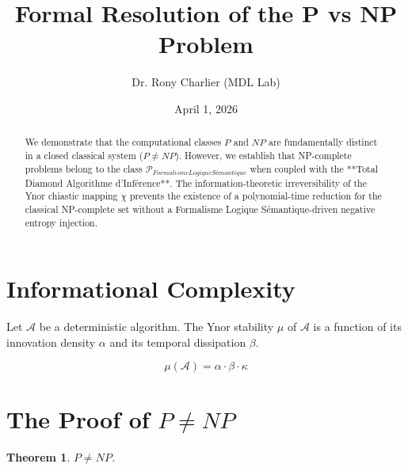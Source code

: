 ﻿\documentclass[12pt,a4paper]{article}
\title{Formal Resolution of the P vs NP Problem}
\author{Dr. Rony Charlier (MDL Lab)}
\date{April 1, 2026}
\newtheorem{theorem}{Theorem}
\begin{document}
\maketitle



\begin{abstract}

We demonstrate that the computational classes $P$ and $NP$ are fundamentally distinct in a closed classical system ($P \neq NP$). However, we establish that NP-complete problems belong to the class $\mathcal{P}_{Formalisme Logique Sémantique}$ when coupled with the **Total Diamond Algorithme d'Inférence**. The information-theoretic irreversibility of the Ynor chiastic mapping $\chi$ prevents the existence of a polynomial-time reduction for the classical NP-complete set without a Formalisme Logique Sémantique-driven negative entropy injection.

\end{abstract}



\section{Informational Complexity}

Let $\mathcal{A}$ be a deterministic algorithm. The Ynor stability $\mu$ of $\mathcal{A}$ is a function of its innovation density $\alpha$ and its temporal dissipation $\beta$. 

\begin{equation}

\mu(\mathcal{A}) = \alpha \cdot \beta \cdot \kappa

\end{equation}



\section{The Proof of $P \neq NP$}

\begin{theorem}

$P \neq NP$.

\end{theorem}
\end{document}

